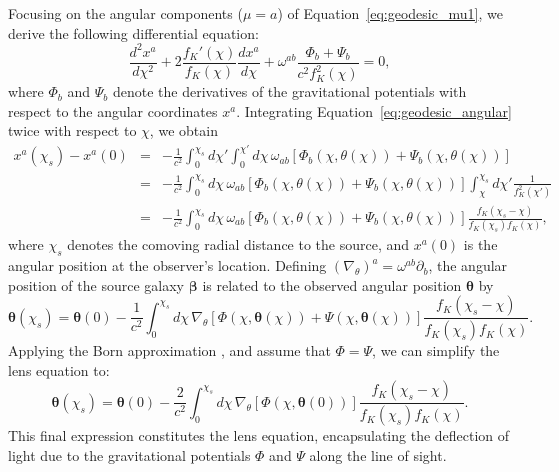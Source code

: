 Focusing on the angular components (\( \mu = a \)) of Equation~\eqref{eq:geodesic_mu1}, we derive the following differential equation:
\begin{equation}
    \frac{d^2 x^a}{d\chi^2} + 2 \frac{f_K'(\chi)}{f_K(\chi)} \frac{dx^a}{d\chi} + \omega^{ab} \frac{\Phi_b + \Psi_b}{c^2 f_K^2(\chi)} = 0,
    \label{eq:geodesic_angular}
\end{equation}
where \( \Phi_b \) and \( \Psi_b \) denote the derivatives of the gravitational potentials with respect to the angular coordinates \( x^a \).
Integrating Equation~\eqref{eq:geodesic_angular} twice with respect to \( \chi \), we obtain
\begin{eqnarray}
    x^a(\chi_s) - x^a(0) &=& -\frac{1}{c^2} \int_0^{\chi_s} d\chi' \int_0^{\chi'} d\chi \, \omega_{ab} \left[ \Phi_b(\chi, \theta(\chi)) + \Psi_b(\chi, \theta(\chi)) \right] \nonumber \\
    &=& -\frac{1}{c^2} \int_0^{\chi_s} d\chi \, \omega_{ab} \left[ \Phi_b(\chi, \theta(\chi)) + \Psi_b(\chi, \theta(\chi)) \right] \int_{\chi}^{\chi_s} d\chi' \frac{1}{f_K^2(\chi')} \nonumber \\
    &=& -\frac{1}{c^2} \int_0^{\chi_s} d\chi \, \omega_{ab} \left[ \Phi_b(\chi, \theta(\chi)) + \Psi_b(\chi, \theta(\chi)) \right] \frac{f_K(\chi_s - \chi)}{f_K(\chi_s)f_K(\chi)},
    \label{eq:xa_integrated}
\end{eqnarray}
where \( \chi_s \) denotes the comoving radial distance to the source, and \( x^a(0) \) is the angular position at the observer's location.
Defining $(\nabla_\theta)^a = \omega^{ab} \partial_b$, the angular position of the source galaxy $\boldsymbol{\beta}$ is related to the observed angular position $\boldsymbol{\theta}$ by
\begin{equation}
    \boldsymbol{\theta}(\chi_s) = \boldsymbol{\theta}(0) - \frac{1}{c^2} \int_0^{\chi_s} d\chi \, \nabla_\theta \left[ \Phi\left(\chi, \boldsymbol{\theta}(\chi)\right) + \Psi\left(\chi, \boldsymbol{\theta}(\chi)\right) \right] \frac{f_K(\chi_s - \chi)}{f_K(\chi_s)f_K(\chi)}.
    \label{eq:lens_equation}
\end{equation}
Applying the Born approximation \citep{1926ZPhy...38..803B}, and assume that $\Phi = \Psi$, we can simplify the lens equation to:
\begin{equation}
    \boldsymbol{\theta}(\chi_s) = \boldsymbol{\theta}(0) - \frac{2}{c^2} \int_0^{\chi_s} d\chi \, \nabla_\theta \left[ \Phi\left(\chi, \boldsymbol{\theta}(0)\right) \right]\frac{f_K(\chi_s - \chi)}{f_K(\chi_s)f_K(\chi)}.
    \label{eq:lens_equation_born}
\end{equation}
This final expression constitutes the lens equation, encapsulating the deflection of light due to the gravitational potentials \( \Phi \) and \( \Psi \) along the line of sight. 

